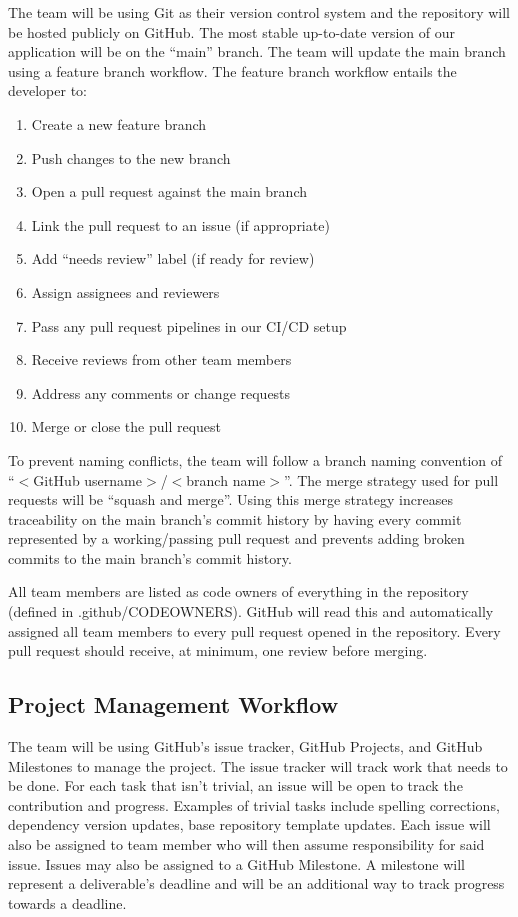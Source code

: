 \documentclass{article}
\begin{document}
The team will be using Git as their version control system and the repository will be hosted
publicly on GitHub. The most stable up-to-date version of our application will be on the ``main''
branch. The team will update the main branch using a feature branch workflow. The feature branch
workflow entails the developer to:

\begin{enumerate}
  \item Create a new feature branch
  \item Push changes to the new branch
  \item Open a pull request against the main branch
  \item Link the pull request to an issue (if appropriate)
  \item Add ``needs review'' label (if ready for review)
  \item Assign assignees and reviewers
  \item Pass any pull request pipelines in our CI/CD setup
  \item Receive reviews from other team members
  \item Address any comments or change requests
  \item Merge or close the pull request
\end{enumerate}

To prevent naming conflicts, the team will follow a branch naming convention of
``$<$GitHub username$>$/$<$branch name$>$''. The merge strategy used for pull requests will be
``squash and merge''. Using this merge strategy increases traceability on the main branch's commit
history by having every commit represented by a working/passing pull request and prevents adding
broken commits to the main branch's commit history.

All team members are listed as code owners of everything in the repository (defined in
.github/CODEOWNERS). GitHub will read this and automatically assigned all team members to every pull
request opened in the repository. Every pull request should receive, at minimum, one review before
merging.

\subsection{Project Management Workflow}

The team will be using GitHub's issue tracker, GitHub Projects, and GitHub Milestones to manage the
project. The issue tracker will track work that needs to be done. For each task that isn't trivial,
an issue will be open to track the contribution and progress. Examples of trivial tasks include
spelling corrections, dependency version updates, base repository template updates. Each issue will
also be assigned to team member who will then assume responsibility for said issue. Issues may also
be assigned to a GitHub Milestone. A milestone will represent a deliverable's deadline and will be
an additional way to track progress towards a deadline.
\end{document}
